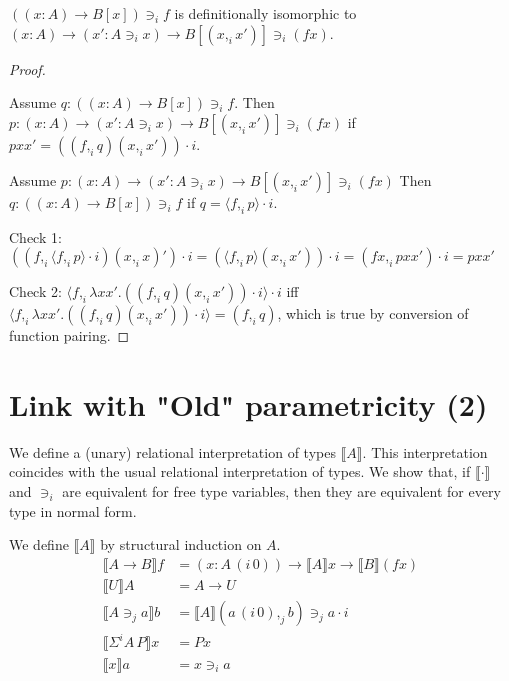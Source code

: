 \documentclass[english]{PaperTools/latex/lipics}
\newcommand\CP[3]{(#2,_{#1} #3)}
\newcommand\param[1]{\!\cdot\!#1}
\newcommand\op[1]{∋_{#1}}
\newcommand\ip[3]{Σ^{#1} {#2}\,{#3}}
\newcommand\fp[3]{⟨#2 ,_{#1} #3⟩}
\newcommand\mor[2]{{#1}\,{#2}}
\newcommand\proj[2]{\mor{#2}{(#1\,0)}}
\begin{document}
\begin{theorem}
$((x:A) → B[x]) \op i f$ is definitionally isomorphic to $(x:A) → (x' : A \op i x) → B[\CP i x {x'}] \op i (f x)$.
\end{theorem}
\begin{proof}~
  \item Assume $q : ((x:A) → B[x]) \op i f$. Then $p : (x:A) → (x' : A \op i x) → B[\CP i x {x'}] \op i (f x)$ if $p x x' = (\CP i f q \CP i x {x'}) \param i$.
  \item Assume $p : (x:A) → (x' : A \op i x) → B[\CP i x {x'}] \op i (f x)$ Then $q : ((x:A) → B[x]) \op i f$ if $q = \fp i f p \param i$.
  \item Check 1: $(\CP i f {\fp i f p \param i} \CP i x x') \param i = ({\fp i f p} \CP i x {x'}) \param i = \CP i {f x} {p x x'} \param i = p x x' $
  \item Check 2: $\fp i f {λx x'. (\CP i f q \CP i x {x'}) \param i} \param i$ iff $\fp i f {λx x'. (\CP i f q \CP i x {x'}) \param i} = \CP i f q$, which is true by conversion of function pairing.
\end{proof}
\section{Link with "Old" parametricity (2)}
We define a (unary) relational interpretation of types $⟦A⟧$. This
interpretation coincides with the usual relational interpretation of types.
We show that, if $⟦·⟧$ and $∋_i$ are equivalent for free type variables,
then they are equivalent for every type in normal form.

\begin{definition}
We define $⟦A⟧$ by structural induction on $A$.
  \begin{align*}
    ⟦A → B⟧ f & = (x:\proj i A) → ⟦A⟧ x → ⟦B⟧ (f x)\\
    ⟦U⟧ A & = A → U\\
    ⟦A \op j a ⟧ b &= ⟦A⟧ \CP j {\proj i a} b \op j a \param i \\
    ⟦\ip i A P⟧ x & = P x\\
    ⟦x⟧ a & = x \op i a
  \end{align*}
\end{definition}

\providecommand\TO{\overrightarrow}
\providecommand\FROM{\overleftarrow}
\end{document}
